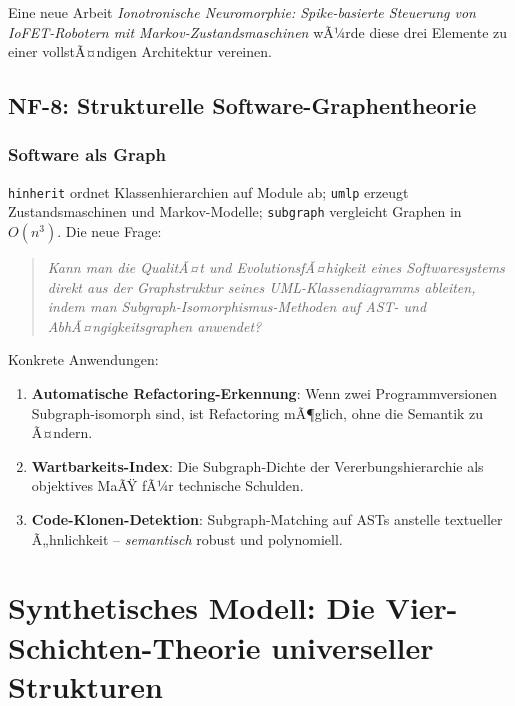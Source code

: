 ﻿\documentclass[a4paper,12pt]{scrreprt}
\theoremstyle{definition}
\begin{document}
Eine neue Arbeit \emph{Ionotronische Neuromorphie: Spike-basierte Steuerung
von IoFET-Robotern mit Markov-Zustandsmaschinen} wÃ¼rde diese drei Elemente
zu einer vollstÃ¤ndigen Architektur vereinen.

\subsection{NF-8: Strukturelle Software-Graphentheorie}

\subsubsection{Software als Graph}

\texttt{hinherit} ordnet Klassenhierarchien auf Module ab;
\texttt{umlp} erzeugt Zustandsmaschi\-nen und Markov-Modelle;
\texttt{subgraph} vergleicht Graphen in $O(n^3)$. Die neue Frage:

\begin{quote}
  \itshape
  Kann man die QualitÃ¤t und EvolutionsfÃ¤higkeit eines Softwaresystems
  direkt aus der Graphstruktur seines UML-Klassendiagramms ableiten,
  indem man Subgraph-Isomorphismus-Methoden auf AST- und
  AbhÃ¤ngigkeitsgraphen anwendet?
\end{quote}

Konkrete Anwendungen:
\begin{enumerate}
  \item \textbf{Automatische Refactoring-Erkennung}: Wenn zwei
    Programmversionen Subgraph-isomorph sind, ist Refactoring mÃ¶glich,
    ohne die Semantik zu Ã¤ndern.
  \item \textbf{Wartbarkeits-Index}: Die Subgraph-Dichte der Vererbungshierarchie
    als objektives MaÃŸ fÃ¼r technische Schulden.
  \item \textbf{Code-Klonen-Detektion}: Subgraph-Matching auf ASTs anstelle
    textueller Ã„hnlichkeit -- \emph{semantisch} robust und polynomiell.
\end{enumerate}

\section{Synthetisches Modell: Die Vier-Schichten-Theorie
  universeller Strukturen}
\label{sec:vier_schichten}
\end{document}
